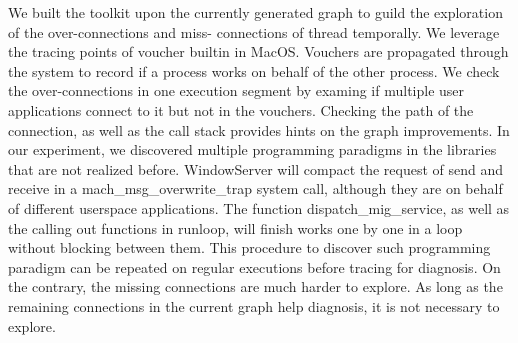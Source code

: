 We built the toolkit upon the currently generated graph to guild the exploration of the over-connections and miss- connections of thread temporally.
We leverage the tracing points of voucher builtin in MacOS.
Vouchers are propagated through the system to record if a process works on behalf of the other process.
We check the over-connections in one execution segment by examing if multiple user applications connect to it but not in the vouchers.
Checking the path of the connection, as well as the call stack provides hints on the graph improvements.
In our experiment, we discovered multiple programming paradigms in the libraries that are not realized before.
WindowServer will compact the request of send and receive in a mach\_msg\_overwrite\_trap system call, although they are on behalf of different userspace applications.
The function dispatch\_mig\_service, as well as the calling out functions in runloop, will finish works one by one in a loop without blocking between them.
This procedure to discover such programming paradigm can be repeated on regular executions before tracing for diagnosis.
On the contrary, the missing connections are much harder to explore.
As long as the remaining connections in the current graph help diagnosis, it is not necessary to explore.
